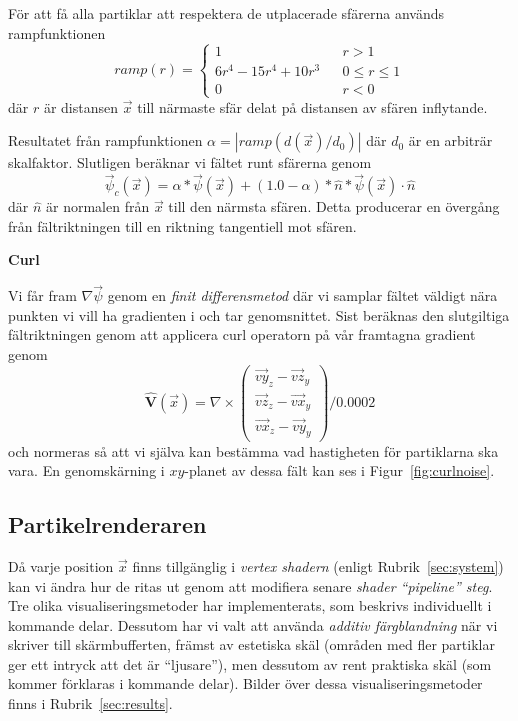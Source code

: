\documentclass[a4paper]{article}
\begin{document}
\begin{multicols}{2}
För att få alla partiklar att respektera de utplacerade sfärerna används rampfunktionen
\begin{equation}
ramp(r) = \left\{\begin{matrix}
1  && r > 1
\\
6r^4 - 15r^4 + 10r^3 && 0 \le r \le 1
\\ 
0  && r < 0
\end{matrix}\right.
\end{equation}
där $r$ är distansen $\vec{x}$ till närmaste sfär delat på distansen av sfären inflytande. 

Resultatet från rampfunktionen $\alpha = | ramp(d(\vec{x})/d_0) |$ där $d_0$  är en arbiträr skalfaktor. Slutligen beräknar vi fältet runt sfärerna genom 
\begin{equation}
\vec{\psi}_c(\vec{x}) = \alpha * \vec{\psi}(\vec{x}) + (1.0 - \alpha) * \hat{n} * \vec{\psi}(\vec{x}) \cdot \hat{n}
\end{equation}
där $\hat{n}$ är normalen från $\vec{x}$ till den närmsta sfären. Detta producerar en övergång från fältriktningen till en riktning tangentiell mot sfären.

\textbf{Curl}

Vi får fram $ \nabla \vec{\psi}$ genom en \textit{finit differensmetod} där vi samplar fältet väldigt nära punkten vi vill ha gradienten i och tar genomsnittet. Sist beräknas den slutgiltiga fältriktningen genom att applicera curl operatorn på vår framtagna gradient genom
\begin{equation}
\mathbf{\hat{V}}(\vec{x}) =
\nabla \times \begin{pmatrix}
\vec{vy}_z - \vec{vz}_y
\\ 
\vec{vz}_z - \vec{vx}_y
\\ 
\vec{vx}_z - \vec{vy}_y
\end{pmatrix} / 0.0002
\end{equation}
och normeras så att vi själva kan bestämma vad hastigheten för partiklarna ska vara. En genomskärning i $xy$-planet av dessa fält kan ses i Figur~\ref{fig:curlnoise}. 

\subsection{Partikelrenderaren} \label{sec:partikelrenderaren}

Då varje position \(\vec{x}\) finns tillgänglig i \emph{vertex shadern} (enligt Rubrik~\ref{sec:system}) kan vi ändra hur de ritas ut genom att modifiera senare \emph{shader ``pipeline'' steg}. Tre olika visualiseringsmetoder har implementerats, som beskrivs individuellt i kommande delar. Dessutom har vi valt att använda \emph{additiv färgblandning} när vi skriver till skärmbufferten, främst av estetiska skäl (områden med fler partiklar ger ett intryck att det är ``ljusare''), men dessutom av rent praktiska skäl (som kommer förklaras i kommande delar). Bilder över dessa visualiseringsmetoder finns i Rubrik~\ref{sec:results}.


\end{multicols}
\end{document}
